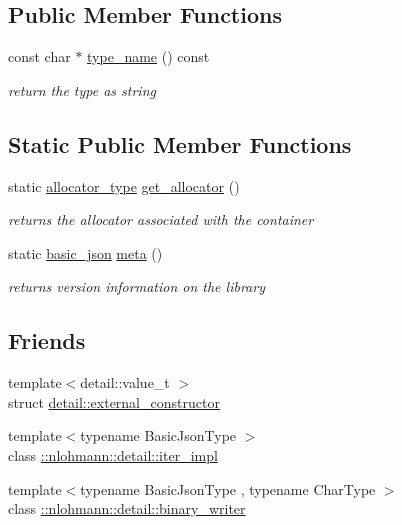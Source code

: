 \subsection*{Public Member Functions}
\begin{DoxyCompactItemize}
\item 
const char $\ast$ \hyperlink{classnlohmann_1_1basic__json_ac1d94c098e7edae0fc36185a84196a6a}{type\+\_\+name} () const 
\begin{DoxyCompactList}\small\item\em return the type as string \end{DoxyCompactList}\end{DoxyCompactItemize}
\subsection*{Static Public Member Functions}
\begin{DoxyCompactItemize}
\item 
static \hyperlink{classnlohmann_1_1basic__json_a86ce930490cf7773b26f5ef49c04a350}{allocator\+\_\+type} \hyperlink{classnlohmann_1_1basic__json_af4ac14224fbdd29d3547fcb11bb55c8f}{get\+\_\+allocator} ()
\begin{DoxyCompactList}\small\item\em returns the allocator associated with the container \end{DoxyCompactList}\item 
static \hyperlink{classnlohmann_1_1basic__json}{basic\+\_\+json} \hyperlink{classnlohmann_1_1basic__json_aef6d0eeccee7c5c7e1317c2ea1607fab}{meta} ()
\begin{DoxyCompactList}\small\item\em returns version information on the library \end{DoxyCompactList}\end{DoxyCompactItemize}
\subsection*{Friends}
\begin{DoxyCompactItemize}
\item 
{\footnotesize template$<$detail\+::value\+\_\+t $>$ }\\struct \hyperlink{classnlohmann_1_1basic__json_a6275ed57bae6866cdf5db5370a7ad47c}{detail\+::external\+\_\+constructor}
\item 
{\footnotesize template$<$typename Basic\+Json\+Type $>$ }\\class \hyperlink{classnlohmann_1_1basic__json_a842e5c7ca096025c18b11e715d3401f4}{\+::nlohmann\+::detail\+::iter\+\_\+impl}
\item 
{\footnotesize template$<$typename Basic\+Json\+Type , typename Char\+Type $>$ }\\class \hyperlink{classnlohmann_1_1basic__json_a69d491bbda88ade6d3c7a2b11309e8bf}{\+::nlohmann\+::detail\+::binary\+\_\+writer}
\end{DoxyCompactItemize}
